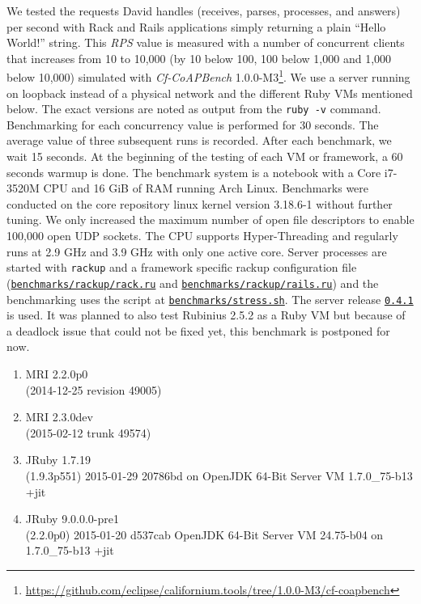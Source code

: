 		We tested the requests David handles (receives, parses, processes, and
		answers) per second with Rack and \ac{Rails} applications simply
		returning a plain \enquote{Hello World!} string. This \emph{\acl{RPS}}
		value is measured with a number of concurrent clients that increases
		from 10 to 10,000 (by 10 below 100, 100 below 1,000 and 1,000 below
		10,000) simulated with \emph{Cf-CoAPBench}
		1.0.0-M3\footnote{\url{https://github.com/eclipse/californium.tools/tree/1.0.0-M3/cf-coapbench}}.
		We use a server running on loopback instead of a physical network and
		the different Ruby \acp{VM} mentioned below. The exact versions are
		noted as output from the \texttt{ruby -v} command. Benchmarking for
		each concurrency value is performed for 30 seconds. The average value
		of three subsequent runs is recorded. After each benchmark, we wait 15
		seconds. At the beginning of the testing of each \ac{VM} or framework,
		a 60 seconds warmup is done. The benchmark system is a notebook with a
		Core i7-3520M \ac{CPU} and 16 GiB of \ac{RAM} running Arch Linux.
		Benchmarks were conducted on the core repository linux kernel version
		3.18.6-1 without further tuning. We only increased the maximum number
		of open file descriptors to enable 100,000 open \acs{UDP} sockets. The
		\ac{CPU} supports Hyper-Threading and regularly runs at 2.9 GHz and 3.9
		GHz with only one active core. Server processes are started with
		\texttt{rackup} and a framework specific rackup configuration file
		(\href{https://github.com/nning/david/blob/0.4.1/benchmarks/rackup/rack.ru}{\texttt{benchmarks/rackup/rack.ru}}
		and
		\href{https://github.com/nning/david/blob/0.4.1/benchmarks/rackup/rails.ru}{\texttt{benchmarks/rackup/rails.ru}})
		and the benchmarking uses the script at
		\href{https://github.com/nning/david/blob/0.4.1/benchmarks/stress.sh}{\texttt{benchmarks/stress.sh}}.
		The server release
		\href{https://github.com/nning/david/tree/0.4.1}{\texttt{0.4.1}} is
		used. It was planned to also test Rubinius 2.5.2 as a Ruby \ac{VM} but
		because of a deadlock issue that could not be fixed yet, this benchmark
		is postponed for now.

		\begin{enumerate}
			\item \ac{MRI} 2.2.0p0\\
				(2014-12-25 revision 49005)
			\item \ac{MRI} 2.3.0dev\\
				(2015-02-12 trunk 49574)
			\item JRuby 1.7.19\\
				(1.9.3p551) 2015-01-29 20786bd on OpenJDK 64-Bit Server VM
				1.7.0\_75-b13 +jit
			\item JRuby 9.0.0.0-pre1\\
				(2.2.0p0) 2015-01-20 d537cab OpenJDK 64-Bit Server VM
				24.75-b04 on 1.7.0\_75-b13 +jit
		\end{enumerate}

